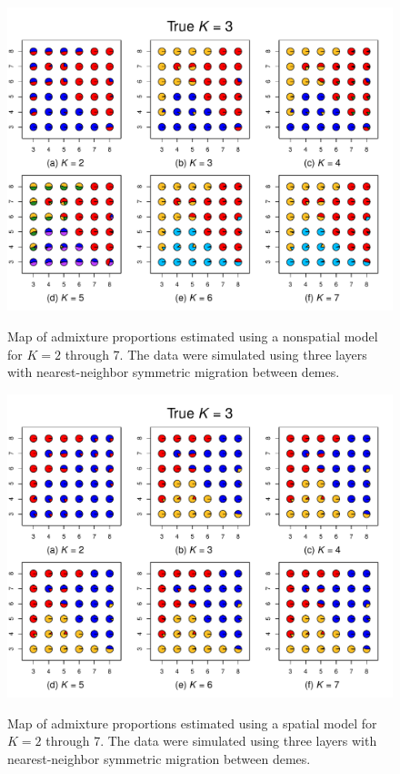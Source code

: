 \documentclass[10pt,letterpaper]{article}
\begin{document}
\begin{figure}
	\centering
		{\includegraphics[width=\textwidth]{figs/sims/simK3_nsp_pies.pdf}}
	\caption{
	Map of admixture proportions estimated using a nonspatial model for $K=2$ through 7.
	The data were simulated using three layers with nearest-neighbor symmetric migration between demes.
    }\label{simK3_nsp_pies}
\end{figure}
\clearpage

\begin{figure}
	\centering
		{\includegraphics[width=\textwidth]{figs/sims/simK3_sp_pies.pdf}}
	\caption{
	Map of admixture proportions estimated using a spatial model for $K=2$ through 7.
	The data were simulated using three layers with nearest-neighbor symmetric migration between demes.
    }\label{simK3_sp_pies}
\end{figure}
\clearpage
\end{document}
